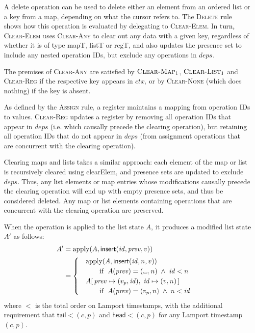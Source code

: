 \documentclass[a4paper,twocolumn,10pt]{article}
\newif\ifproofdraft
\newcommand{\placeholder}{%
  \makebox[0.7em]{%
    \kern.07em
    \vrule height.3ex
    \hrulefill
    \vrule height.3ex
    \kern.07em
  }%
}
\begin{document}
A \textsf{delete} operation can be used to delete either an element from an ordered list or a key from a map, depending on what the cursor refers to. The \textsc{Delete} rule shows how this operation is evaluated by delegating to \textsc{Clear-Elem}. In turn, \textsc{Clear-Elem} uses \textsc{Clear-Any} to clear out any data with a given key, regardless of whether it is of type \textsf{mapT}, \textsf{listT} or \textsf{regT}, and also updates the presence set to include any nested operation IDs, but exclude any operations in $\mathit{deps}$.

The premises of \textsc{Clear-Any} are satisfied by $\textsc{Clear-Map}_1$, $\textsc{Clear-List}_1$ and \textsc{Clear-Reg} if the respective key appears in $\mathit{ctx}$, or by \textsc{Clear-None} (which does nothing) if the key is absent.

As defined by the \textsc{Assign} rule, a register maintains a mapping from operation IDs to values. \textsc{Clear-Reg} updates a register by removing all operation IDs that appear in $\mathit{deps}$ (i.e. which causally precede the clearing operation), but retaining all operation IDs that do not appear in $\mathit{deps}$ (from assignment operations that are concurrent with the clearing operation).

Clearing maps and lists takes a similar approach: each element of the map or list is recursively cleared using \textsf{clearElem}, and presence sets are updated to exclude $\mathit{deps}$. Thus, any list elements or map entries whose modifications causally precede the clearing operation will end up with empty presence sets, and thus be considered deleted. Any map or list elements containing operations that are concurrent with the clearing operation are preserved.

\ifproofdraft

When the operation is applied to the list state $A$, it produces a modified list state $A'$ as follows:
\begin{align*}
A' &= \mathrm{apply}(A, \mathsf{insert}(\mathit{id}, \mathit{prev}, v)) \\ &=
\begin{cases}
\quad \mathrm{apply}(A, \mathsf{insert}(\mathit{id}, n, v)) \\
    \qquad\quad\text{if }\; A(\mathit{prev}) = (\placeholder, n) \;\wedge\; \mathit{id} < n \\
\quad A[\,\mathit{prev} \mapsto (v_p, \mathit{id}),\; \mathit{id} \mapsto (v, n)\,] \\
    \qquad\quad\text{if }\; A(\mathit{prev}) = (v_p, n) \;\wedge\; n < \mathit{id}
\end{cases}
\end{align*}
where $<$ is the total order on Lamport timestamps, with the additional requirement that $\mathsf{tail} < (c, p)$ and $\mathsf{head} < (c, p)$ for any Lamport timestamp $(c, p)$.
\end{document}
